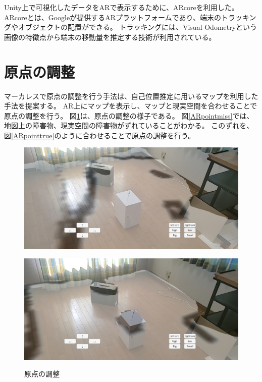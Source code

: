Unity上で可視化したデータをARで表示するために、ARcoreを利用した。
ARcoreとは、Googleが提供するARプラットフォームであり、端末のトラッキングやオブジェクトの配置ができる。
トラッキングには、Visual Odometryという画像の特徴点から端末の移動量を推定する技術が利用されている。


\section{原点の調整}

マーカレスで原点の調整を行う手法は、自己位置推定に用いるマップを利用した手法を提案する。
AR上にマップを表示し、マップと現実空間を合わせることで原点の調整を行う。
図\ref{ARpoint}は、原点の調整の様子である。
図\ref{ARpointmiss}では、地図上の障害物、現実空間の障害物がずれていることがわかる。
このずれを、図\ref{ARpointtrue}のように合わせることで原点の調整を行う。

\begin{figure}[H]
  \begin{minipage}[b]{0.45\linewidth}
    \centering
    \includegraphics[keepaspectratio, width=.9\hsize]{figs/ARmiss.jpg}
    \label{ARpointmiss}
  \end{minipage}
  \begin{minipage}[b]{0.45\linewidth}
    \centering
    \includegraphics[keepaspectratio, width=.9\hsize]{figs/ARtrue.jpg}
    \label{ARpointtrue}
  \end{minipage}
  \caption{原点の調整}\label{ARpoint}
\end{figure}



